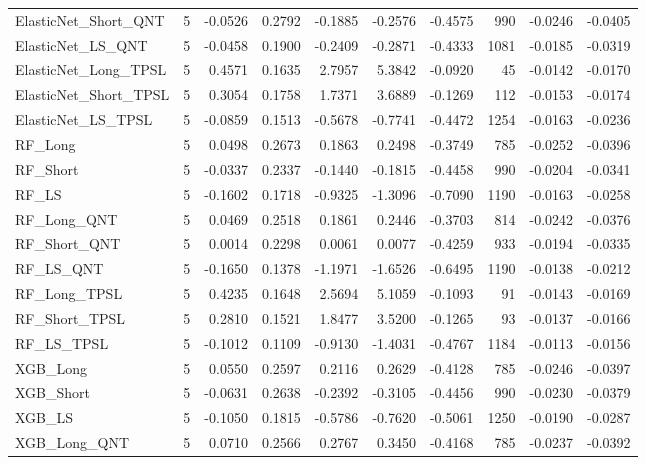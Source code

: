 \begin{tabular}{llrrrrrrrr}
\cline{1-10}
ElasticNet\_Short\_QNT & 5 & -0.0526 & 0.2792 & -0.1885 & -0.2576 & -0.4575 & 990 & -0.0246 & -0.0405 \\
\cline{1-10}
ElasticNet\_LS\_QNT & 5 & -0.0458 & 0.1900 & -0.2409 & -0.2871 & -0.4333 & 1081 & -0.0185 & -0.0319 \\
\cline{1-10}
ElasticNet\_Long\_TPSL & 5 & 0.4571 & 0.1635 & 2.7957 & 5.3842 & -0.0920 & 45 & -0.0142 & -0.0170 \\
\cline{1-10}
ElasticNet\_Short\_TPSL & 5 & 0.3054 & 0.1758 & 1.7371 & 3.6889 & -0.1269 & 112 & -0.0153 & -0.0174 \\
\cline{1-10}
ElasticNet\_LS\_TPSL & 5 & -0.0859 & 0.1513 & -0.5678 & -0.7741 & -0.4472 & 1254 & -0.0163 & -0.0236 \\
\cline{1-10}
RF\_Long & 5 & 0.0498 & 0.2673 & 0.1863 & 0.2498 & -0.3749 & 785 & -0.0252 & -0.0396 \\
\cline{1-10}
RF\_Short & 5 & -0.0337 & 0.2337 & -0.1440 & -0.1815 & -0.4458 & 990 & -0.0204 & -0.0341 \\
\cline{1-10}
RF\_LS & 5 & -0.1602 & 0.1718 & -0.9325 & -1.3096 & -0.7090 & 1190 & -0.0163 & -0.0258 \\
\cline{1-10}
RF\_Long\_QNT & 5 & 0.0469 & 0.2518 & 0.1861 & 0.2446 & -0.3703 & 814 & -0.0242 & -0.0376 \\
\cline{1-10}
RF\_Short\_QNT & 5 & 0.0014 & 0.2298 & 0.0061 & 0.0077 & -0.4259 & 933 & -0.0194 & -0.0335 \\
\cline{1-10}
RF\_LS\_QNT & 5 & -0.1650 & 0.1378 & -1.1971 & -1.6526 & -0.6495 & 1190 & -0.0138 & -0.0212 \\
\cline{1-10}
RF\_Long\_TPSL & 5 & 0.4235 & 0.1648 & 2.5694 & 5.1059 & -0.1093 & 91 & -0.0143 & -0.0169 \\
\cline{1-10}
RF\_Short\_TPSL & 5 & 0.2810 & 0.1521 & 1.8477 & 3.5200 & -0.1265 & 93 & -0.0137 & -0.0166 \\
\cline{1-10}
RF\_LS\_TPSL & 5 & -0.1012 & 0.1109 & -0.9130 & -1.4031 & -0.4767 & 1184 & -0.0113 & -0.0156 \\
\cline{1-10}
XGB\_Long & 5 & 0.0550 & 0.2597 & 0.2116 & 0.2629 & -0.4128 & 785 & -0.0246 & -0.0397 \\
\cline{1-10}
XGB\_Short & 5 & -0.0631 & 0.2638 & -0.2392 & -0.3105 & -0.4456 & 990 & -0.0230 & -0.0379 \\
\cline{1-10}
XGB\_LS & 5 & -0.1050 & 0.1815 & -0.5786 & -0.7620 & -0.5061 & 1250 & -0.0190 & -0.0287 \\
\cline{1-10}
XGB\_Long\_QNT & 5 & 0.0710 & 0.2566 & 0.2767 & 0.3450 & -0.4168 & 785 & -0.0237 & -0.0392 \\

\end{tabular}
